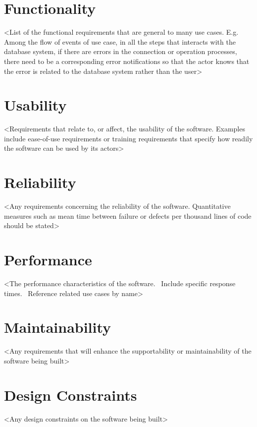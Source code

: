 \documentclass[letterpaper]{report}
\begin{document}
\section{Functionality}
{\textless}List of the functional requirements that are general to many use cases. E.g. Among the flow of events of use case, in all the steps that interacts with the database system, if there are errors in the connection or operation processes, there need to be a corresponding error notifications so that the actor knows that the error is related to the database system rather than the user{\textgreater}

\section{Usability}
{\textless}Requirements that relate to, or affect, the usability of the software. Examples include ease-of-use requirements or training requirements that specify how readily the software can be used by its actors{\textgreater}

\section{Reliability}
{\textless}Any requirements concerning the reliability of the software. Quantitative measures such as mean time between failure or defects per thousand lines of code should be stated{\textgreater}

\section{Performance}
{\textless}The performance characteristics of the software. \ Include specific response times. \ Reference related use cases by name{\textgreater}

\section{Maintainability}
{\textless}Any requirements that will enhance the supportability or maintainability of the software being built{\textgreater}

\section{Design Constraints}
{\textless}Any design constraints on the software being built{\textgreater}
\end{document}
